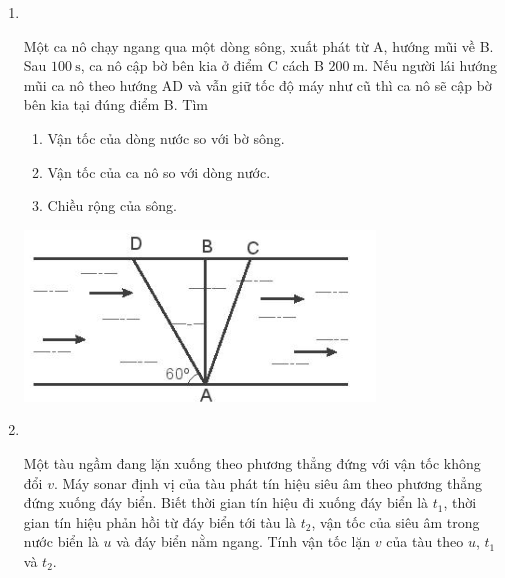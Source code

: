 \begin{enumerate}[label=\bfseries Bài \arabic*:]
{}

\item {}\\
{\begin{minipage}[l]{0.7\textwidth}
		Một ca nô chạy ngang qua một dòng sông, xuất phát từ A, hướng mũi về B. Sau $\SI{100}{\second}$, ca nô cập bờ bên kia ở điểm C cách B $\SI{200}{\meter}$. Nếu người lái hướng mũi ca nô theo hướng AD và vẫn giữ tốc độ máy như cũ thì ca nô sẽ cập bờ bên kia tại đúng điểm B. Tìm
		\begin{enumerate}[label=\alph*)]
			\item Vận tốc của dòng nước so với bờ sông.
			\item Vận tốc của ca nô so với dòng nước.
			\item Chiều rộng của sông.
		\end{enumerate}
	\end{minipage}
	\begin{minipage}{0.3\textwidth}
	\begin{center}
		\includegraphics[width=0.8\linewidth]{../figs/VN10-2023-PH-TP0002-8}
	\end{center}
	\end{minipage}
}

\item {}\\
{Một tàu ngầm đang lặn xuống theo phương thẳng đứng với vận tốc không đổi $v$. Máy sonar định vị của tàu phát tín hiệu siêu âm theo phương thẳng đứng xuống đáy biển. Biết thời gian tín hiệu đi xuống đáy biển là $t_1$, thời gian tín hiệu phản hồi từ đáy biển tới tàu là $t_2$, vận tốc của siêu âm trong nước biển là $u$ và đáy biển nằm ngang. Tính vận tốc lặn $v$ của tàu theo $u$, $t_1$ và $t_2$.

}
\end{enumerate}